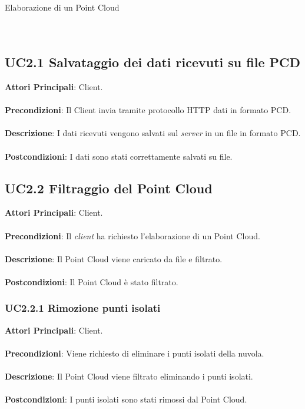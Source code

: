 \begin{usecase}{2}{Elaborazione di un Point Cloud}
\\ 
\\ 
\\ 
\label{uc:elaborazione}
\end{usecase}

\subsection{UC2.1 Salvataggio dei dati ricevuti su file PCD}
\textbf{Attori Principali}: Client.
\\\\ \textbf{Precondizioni}: Il Client invia tramite protocollo HTTP dati in formato PCD.
\\\\ \textbf{Descrizione}: I dati ricevuti vengono salvati sul \emph{server} in un file in formato PCD.
\\\\ \textbf{Postcondizioni}: I dati sono stati correttamente salvati su file.

\subsection{UC2.2 Filtraggio del Point Cloud}
\textbf{Attori Principali}: Client.
\\\\ \textbf{Precondizioni}: Il \emph{client} ha richiesto l'elaborazione di un Point Cloud.
\\\\ \textbf{Descrizione}: Il Point Cloud viene caricato da file e filtrato.
\\\\ \textbf{Postcondizioni}: Il Point Cloud è stato filtrato.

\subsubsection{UC2.2.1 Rimozione punti isolati}
\textbf{Attori Principali}: Client.
\\\\ \textbf{Precondizioni}: Viene richiesto di eliminare i punti isolati della nuvola.
\\\\ \textbf{Descrizione}: Il Point Cloud viene filtrato eliminando i punti isolati.
\\\\ \textbf{Postcondizioni}: I punti isolati sono stati rimossi dal Point Cloud.

